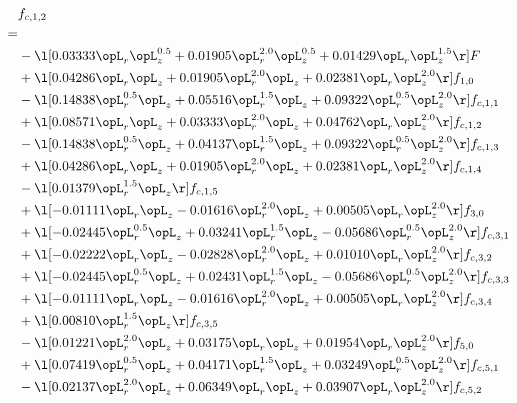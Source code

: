 \begin{alignat}{2} 
\label{eq:f_12_1} 
& f_{c,1,2} \nonumber \\ 
 = \\ 
& - \l[  0.03333 \opL_r \opL_z^{0.5} +  0.01905 \opL_r^{2.0} \opL_z^{0.5} +  0.01429 \opL_r \opL_z^{1.5}  \r] F \nonumber \\ 
& + \l[  0.04286 \opL_r \opL_z +  0.01905 \opL_r^{2.0} \opL_z +  0.02381 \opL_r \opL_z^{2.0}  \r] f_{1,0} \nonumber \\ 
& - \l[  0.14838 \opL_r^{0.5} \opL_z +  0.05516 \opL_r^{1.5} \opL_z +  0.09322 \opL_r^{0.5} \opL_z^{2.0}  \r] f_{c,1,1} \nonumber \\ 
& + \l[  0.08571 \opL_r \opL_z +  0.03333 \opL_r^{2.0} \opL_z +  0.04762 \opL_r \opL_z^{2.0}  \r] f_{c,1,2} \nonumber \\ 
& - \l[  0.14838 \opL_r^{0.5} \opL_z +  0.04137 \opL_r^{1.5} \opL_z +  0.09322 \opL_r^{0.5} \opL_z^{2.0}  \r] f_{c,1,3} \nonumber \\ 
& + \l[  0.04286 \opL_r \opL_z +  0.01905 \opL_r^{2.0} \opL_z +  0.02381 \opL_r \opL_z^{2.0}  \r] f_{c,1,4} \nonumber \\ 
& - \l[  0.01379 \opL_r^{1.5} \opL_z  \r] f_{c,1,5} \nonumber \\ 
& + \l[  -0.01111 \opL_r \opL_z   -0.01616 \opL_r^{2.0} \opL_z +  0.00505 \opL_r \opL_z^{2.0}  \r] f_{3,0} \nonumber \\ 
& + \l[  -0.02445 \opL_r^{0.5} \opL_z +  0.03241 \opL_r^{1.5} \opL_z   -0.05686 \opL_r^{0.5} \opL_z^{2.0}  \r] f_{c,3,1} \nonumber \\ 
& + \l[  -0.02222 \opL_r \opL_z   -0.02828 \opL_r^{2.0} \opL_z +  0.01010 \opL_r \opL_z^{2.0}  \r] f_{c,3,2} \nonumber \\ 
& + \l[  -0.02445 \opL_r^{0.5} \opL_z +  0.02431 \opL_r^{1.5} \opL_z   -0.05686 \opL_r^{0.5} \opL_z^{2.0}  \r] f_{c,3,3} \nonumber \\ 
& + \l[  -0.01111 \opL_r \opL_z   -0.01616 \opL_r^{2.0} \opL_z +  0.00505 \opL_r \opL_z^{2.0}  \r] f_{c,3,4} \nonumber \\ 
& + \l[  0.00810 \opL_r^{1.5} \opL_z  \r] f_{c,3,5} \nonumber \\ 
& - \l[  0.01221 \opL_r^{2.0} \opL_z +  0.03175 \opL_r \opL_z +  0.01954 \opL_r \opL_z^{2.0}  \r] f_{5,0} \nonumber \\ 
& + \l[  0.07419 \opL_r^{0.5} \opL_z +  0.04171 \opL_r^{1.5} \opL_z +  0.03249 \opL_r^{0.5} \opL_z^{2.0}  \r] f_{c,5,1} \nonumber \\ 
& - \l[  0.02137 \opL_r^{2.0} \opL_z +  0.06349 \opL_r \opL_z +  0.03907 \opL_r \opL_z^{2.0}  \r] f_{c,5,2} \nonumber \\ 

\end{alignat}
